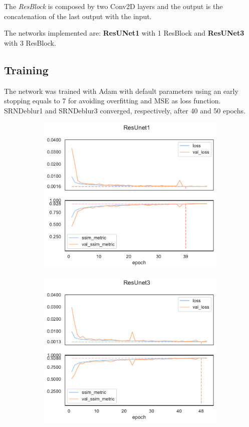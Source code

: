 The \textit{ResBlock} is composed by two Conv2D layers and the output is the concatenation of the last output with the input.  

The networks implemented are: \textbf{ResUNet1} with 1 ResBlock and \textbf{ResUNet3} with 3 ResBlock.

\subsection{Training}
The network was trained with Adam\cite{adam} with default parameters using an early stopping equals to 7 for avoiding overfitting and MSE as loss function.
SRNDeblur1 and SRNDeblur3 converged, respectively, after 40 and 50 epochs.
\begin{figure}[H]
    \begin{subfigure}{\textwidth}
        \centering
        \includegraphics[height=0.4\textheight,keepaspectratio]{subsections/resunet/plot_history_ResUNet1.pdf}            
    \end{subfigure}
    \begin{subfigure}{\textwidth}
        \centering
        \includegraphics[height=0.4\textheight,keepaspectratio]{subsections/resunet/plot_history_ResUNet3.pdf}            

\end{subfigure}
\end{figure}
